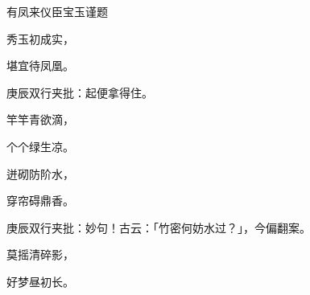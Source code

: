 \begin{poem}
    \begin{pl}有凤来仪臣宝玉谨题\end{pl}

    \begin{pl}秀玉初成实，\end{pl}

    \begin{pl}堪宜待凤凰。\end{pl}\begin{note}庚辰双行夹批：起便拿得住。\end{note}

    \begin{pl}竿竿青欲滴，\end{pl}

    \begin{pl}个个绿生凉。\end{pl}

    \begin{pl}迸砌防阶水，\end{pl}

    \begin{pl}穿帘碍鼎香。\end{pl}\begin{note}庚辰双行夹批：妙句！古云：「竹密何妨水过？」，今偏翻案。\end{note}

    \begin{pl}莫摇清碎影，\end{pl}

    \begin{pl}好梦昼初长。\end{pl}

\end{poem}

